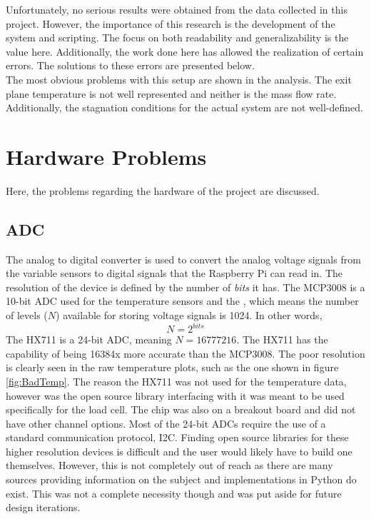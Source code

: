 Unfortunately, no serious results were obtained from the data collected in this project. However, the importance of this research is the development of the system and  scripting. The focus on both readability and generalizability is the value here. Additionally, the work done here has allowed the realization of certain errors. The solutions to these errors are presented below.\\
The most obvious problems with this setup are shown in the analysis. The exit plane temperature is not well represented and neither is the mass flow rate. Additionally, the stagnation conditions for the actual system are not well-defined.
\section{Hardware Problems}
Here, the problems regarding the hardware of the project are discussed.
\subsection{ADC}
The analog to digital converter is used to convert the analog voltage signals from the variable sensors to digital signals that the Raspberry Pi can read in. The resolution of the device is defined by the number of \textit{bits} it has. The MCP3008 is a 10-bit ADC used for the temperature sensors and the , which means the number of levels ($N$) available for storing voltage signals is 1024. In other words,
\begin{equation}
N=2^{bits}
\end{equation}
The HX711 is a 24-bit ADC, meaning $N=16777216$. The HX711 has the capability of being 16384x more accurate than the MCP3008. The poor resolution is clearly seen in the raw temperature plots, such as the one shown in figure \ref{fig:BadTemp}. The reason the HX711 was not used for the temperature data, however was the open source library interfacing with it was meant to be used specifically for the load cell. The chip was also on a breakout board and did not have other channel options. Most of the 24-bit ADCs require the use of a standard communication protocol, I2C. Finding open source libraries for these higher resolution devices is difficult and the user would likely have to build one themselves. However, this is not completely out of reach as there are many sources providing information on the subject and implementations in Python do exist. This was not a complete necessity though and was put aside for future design iterations.
